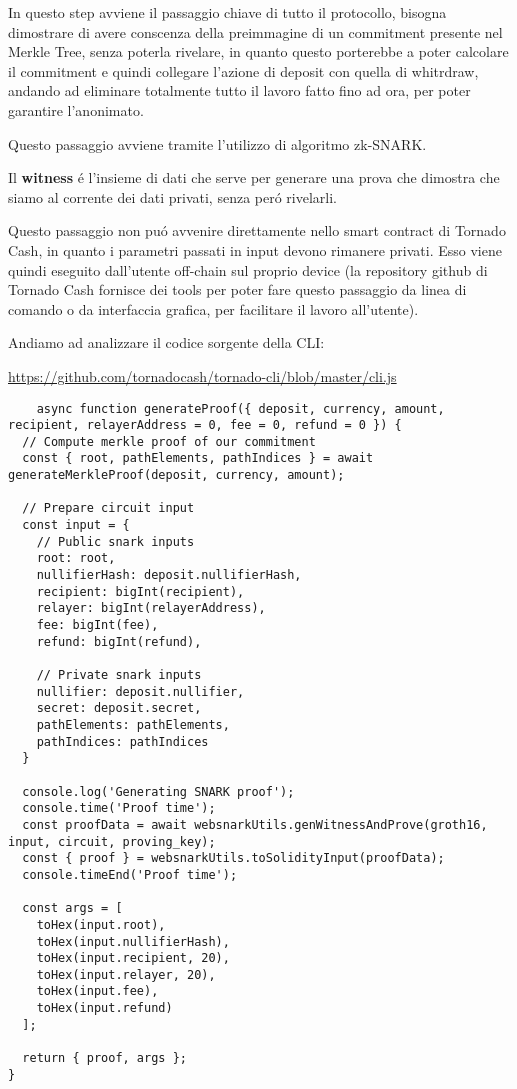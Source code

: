 In questo step avviene il passaggio chiave di tutto il protocollo, bisogna dimostrare di avere conscenza della preimmagine di un commitment presente nel Merkle Tree, senza poterla rivelare, in quanto questo porterebbe a poter calcolare il commitment e quindi collegare l'azione di deposit con quella di whitrdraw, andando ad eliminare totalmente tutto il lavoro fatto fino ad ora, per poter garantire l'anonimato.

Questo passaggio avviene tramite l'utilizzo di algoritmo zk-SNARK.

Il \textbf{witness} é l'insieme di dati che serve per generare una prova che dimostra che siamo al corrente dei dati privati, senza peró rivelarli.

Questo passaggio non puó avvenire direttamente nello smart contract di Tornado Cash, in quanto i parametri passati in input devono rimanere privati. Esso viene quindi eseguito dall'utente off-chain sul proprio device (la repository github di Tornado Cash fornisce dei tools per poter fare questo passaggio da linea di comando o da interfaccia grafica, per facilitare il lavoro all'utente).

Andiamo ad analizzare il codice sorgente della CLI:

\url{https://github.com/tornadocash/tornado-cli/blob/master/cli.js}

\begin{lstlisting}
    async function generateProof({ deposit, currency, amount, recipient, relayerAddress = 0, fee = 0, refund = 0 }) {
  // Compute merkle proof of our commitment
  const { root, pathElements, pathIndices } = await generateMerkleProof(deposit, currency, amount);

  // Prepare circuit input
  const input = {
    // Public snark inputs
    root: root,
    nullifierHash: deposit.nullifierHash,
    recipient: bigInt(recipient),
    relayer: bigInt(relayerAddress),
    fee: bigInt(fee),
    refund: bigInt(refund),

    // Private snark inputs
    nullifier: deposit.nullifier,
    secret: deposit.secret,
    pathElements: pathElements,
    pathIndices: pathIndices
  }

  console.log('Generating SNARK proof');
  console.time('Proof time');
  const proofData = await websnarkUtils.genWitnessAndProve(groth16, input, circuit, proving_key);
  const { proof } = websnarkUtils.toSolidityInput(proofData);
  console.timeEnd('Proof time');

  const args = [
    toHex(input.root),
    toHex(input.nullifierHash),
    toHex(input.recipient, 20),
    toHex(input.relayer, 20),
    toHex(input.fee),
    toHex(input.refund)
  ];

  return { proof, args };
}

\end{lstlisting}


